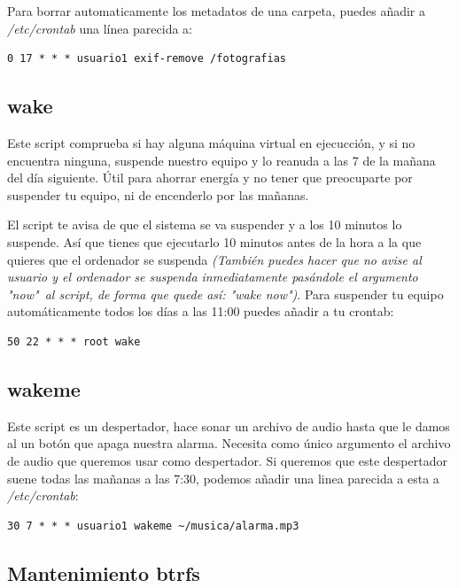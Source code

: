 \documentclass[12pt]{article}
\begin{document}
Para borrar automaticamente los metadatos de una carpeta, puedes añadir a \emph{/etc/crontab} una línea parecida a:

\begin{verbatim}
0 17 * * * usuario1 exif-remove /fotografias
\end{verbatim}

\subsection{wake}

Este script comprueba si hay alguna máquina virtual en ejecucción, y si no encuentra ninguna, suspende nuestro equipo y lo reanuda a las 7 de la mañana del día siguiente. Útil para ahorrar energía y no tener que preocuparte por suspender tu equipo, ni de encenderlo por las mañanas.

El script te avisa de que el sistema se va suspender y a los 10 minutos lo suspende. Así que tienes que ejecutarlo 10 minutos antes de la hora a la que quieres que el ordenador se suspenda \emph{(También puedes hacer que no avise al usuario y el ordenador se suspenda inmediatamente pasándole el argumento "now"\ al script, de forma que quede así: "wake now")}. Para suspender tu equipo automáticamente todos los días a las 11:00 puedes añadir a tu crontab:

\begin{verbatim}
50 22 * * * root wake
\end{verbatim}

\subsection{wakeme}

Este script es un despertador, hace sonar un archivo de audio hasta que le damos al un botón que apaga nuestra alarma. Necesita como único argumento el archivo de audio que queremos usar como despertador. Si queremos que este despertador suene todas las mañanas a las 7:30, podemos añadir una linea parecida a esta a \emph{/etc/crontab}:

\begin{verbatim}
30 7 * * * usuario1 wakeme ~/musica/alarma.mp3
\end{verbatim}

\subsection{Mantenimiento btrfs}
\end{document}
